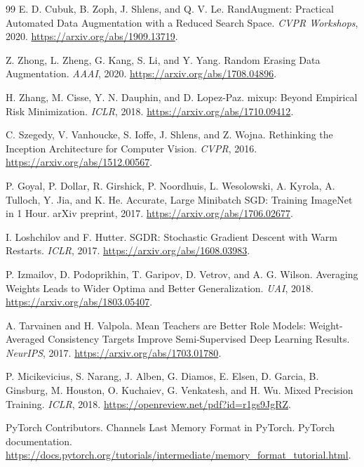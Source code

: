 \documentclass[11pt]{article}
\begin{document}
\begin{thebibliography}{99}
E. D. Cubuk, B. Zoph, J. Shlens, and Q. V. Le.
\newblock RandAugment: Practical Automated Data Augmentation with a Reduced
Search Space.
\newblock \emph{CVPR Workshops}, 2020.
\newblock \url{https://arxiv.org/abs/1909.13719}.

Z. Zhong, L. Zheng, G. Kang, S. Li, and Y. Yang.
\newblock Random Erasing Data Augmentation.
\newblock \emph{AAAI}, 2020.
\newblock \url{https://arxiv.org/abs/1708.04896}.

H. Zhang, M. Cisse, Y. N. Dauphin, and D. Lopez-Paz.
\newblock mixup: Beyond Empirical Risk Minimization.
\newblock \emph{ICLR}, 2018.
\newblock \url{https://arxiv.org/abs/1710.09412}.

C. Szegedy, V. Vanhoucke, S. Ioffe, J. Shlens, and Z. Wojna.
\newblock Rethinking the Inception Architecture for Computer Vision.
\newblock \emph{CVPR}, 2016.
\newblock \url{https://arxiv.org/abs/1512.00567}.

P. Goyal, P. Dollar, R. Girshick, P. Noordhuis, L. Wesolowski, A. Kyrola,
A. Tulloch, Y. Jia, and K. He.
\newblock Accurate, Large Minibatch SGD: Training ImageNet in 1 Hour.
\newblock arXiv preprint, 2017.
\newblock \url{https://arxiv.org/abs/1706.02677}.

I. Loshchilov and F. Hutter.
\newblock SGDR: Stochastic Gradient Descent with Warm Restarts.
\newblock \emph{ICLR}, 2017.
\newblock \url{https://arxiv.org/abs/1608.03983}.

P. Izmailov, D. Podoprikhin, T. Garipov, D. Vetrov, and A. G. Wilson.
\newblock Averaging Weights Leads to Wider Optima and Better Generalization.
\newblock \emph{UAI}, 2018.
\newblock \url{https://arxiv.org/abs/1803.05407}.

A. Tarvainen and H. Valpola.
\newblock Mean Teachers are Better Role Models: Weight-Averaged Consistency
Targets Improve Semi-Supervised Deep Learning Results.
\newblock \emph{NeurIPS}, 2017.
\newblock \url{https://arxiv.org/abs/1703.01780}.

P. Micikevicius, S. Narang, J. Alben, G. Diamos, E. Elsen, D. Garcia,
B. Ginsburg, M. Houston, O. Kuchaiev, G. Venkatesh, and H. Wu.
\newblock Mixed Precision Training.
\newblock \emph{ICLR}, 2018.
\newblock \url{https://openreview.net/pdf?id=r1gs9JgRZ}.

PyTorch Contributors.
\newblock Channels Last Memory Format in PyTorch.
\newblock PyTorch documentation.
\newblock \url{https://docs.pytorch.org/tutorials/intermediate/memory_format_tutorial.html}.

\end{thebibliography}
\end{document}
